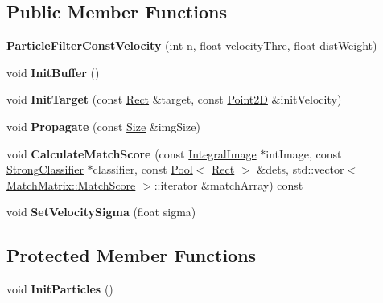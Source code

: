 \subsection*{Public Member Functions}
\begin{DoxyCompactItemize}
\item 
\hypertarget{classParticleFilterConstVelocity_a0ae711261a1d992e08de13dac7e2ea70}{}{\bfseries Particle\+Filter\+Const\+Velocity} (int n, float velocity\+Thre, float dist\+Weight)\label{classParticleFilterConstVelocity_a0ae711261a1d992e08de13dac7e2ea70}

\item 
\hypertarget{classParticleFilterConstVelocity_a57692c0a571ab54262e2762469b10b00}{}void {\bfseries Init\+Buffer} ()\label{classParticleFilterConstVelocity_a57692c0a571ab54262e2762469b10b00}

\item 
\hypertarget{classParticleFilterConstVelocity_a3407d048b97f8caebe1353d53f831547}{}void {\bfseries Init\+Target} (const \hyperlink{classRect}{Rect} \&target, const \hyperlink{classPoint2D}{Point2\+D} \&init\+Velocity)\label{classParticleFilterConstVelocity_a3407d048b97f8caebe1353d53f831547}

\item 
\hypertarget{classParticleFilterConstVelocity_a72868ab78e4c4f49ce756e986839f993}{}void {\bfseries Propagate} (const \hyperlink{classSize}{Size} \&img\+Size)\label{classParticleFilterConstVelocity_a72868ab78e4c4f49ce756e986839f993}

\item 
\hypertarget{classParticleFilterConstVelocity_a0599ad9b4df7d0be14432960e7438148}{}void {\bfseries Calculate\+Match\+Score} (const \hyperlink{classIntegralImage}{Integral\+Image} $\ast$int\+Image, const \hyperlink{classStrongClassifier}{Strong\+Classifier} $\ast$classifier, const \hyperlink{classPool}{Pool}$<$ \hyperlink{classRect}{Rect} $>$ \&dets, std\+::vector$<$ \hyperlink{structMatchMatrix_1_1MatchScore}{Match\+Matrix\+::\+Match\+Score} $>$\+::iterator \&match\+Array) const \label{classParticleFilterConstVelocity_a0599ad9b4df7d0be14432960e7438148}

\item 
\hypertarget{classParticleFilterConstVelocity_a91f6d8afede8039cd3ed08acbcb67b47}{}void {\bfseries Set\+Velocity\+Sigma} (float sigma)\label{classParticleFilterConstVelocity_a91f6d8afede8039cd3ed08acbcb67b47}

\end{DoxyCompactItemize}
\subsection*{Protected Member Functions}
\begin{DoxyCompactItemize}
\item 
\hypertarget{classParticleFilterConstVelocity_a219193c3bdc2ed042c5473257227c3fb}{}void {\bfseries Init\+Particles} ()\label{classParticleFilterConstVelocity_a219193c3bdc2ed042c5473257227c3fb}

\end{DoxyCompactItemize}
